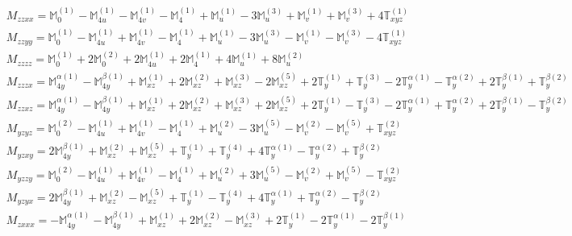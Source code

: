 \documentclass[fleqn,8pt,landscape]{jsarticle}
\begin{document}
\begin{align*}
& M_{zzxx} = \mathbb{M}_{0}^{(1)} - \mathbb{M}_{4u}^{(1)} - \mathbb{M}_{4v}^{(1)} - \mathbb{M}_{4}^{(1)} + \mathbb{M}_{u}^{(1)} - 3 \mathbb{M}_{u}^{(3)} + \mathbb{M}_{v}^{(1)} + \mathbb{M}_{v}^{(3)} + 4 \mathbb{T}_{xyz}^{(1)} \\
& M_{zzyy} = \mathbb{M}_{0}^{(1)} - \mathbb{M}_{4u}^{(1)} + \mathbb{M}_{4v}^{(1)} - \mathbb{M}_{4}^{(1)} + \mathbb{M}_{u}^{(1)} - 3 \mathbb{M}_{u}^{(3)} - \mathbb{M}_{v}^{(1)} - \mathbb{M}_{v}^{(3)} - 4 \mathbb{T}_{xyz}^{(1)} \\
& M_{zzzz} = \mathbb{M}_{0}^{(1)} + 2 \mathbb{M}_{0}^{(2)} + 2 \mathbb{M}_{4u}^{(1)} + 2 \mathbb{M}_{4}^{(1)} + 4 \mathbb{M}_{u}^{(1)} + 8 \mathbb{M}_{u}^{(2)} \\
& M_{zzzx} = \mathbb{M}_{4y}^{\alpha(1)} - \mathbb{M}_{4y}^{\beta(1)} + \mathbb{M}_{xz}^{(1)} + 2 \mathbb{M}_{xz}^{(2)} + \mathbb{M}_{xz}^{(3)} - 2 \mathbb{M}_{xz}^{(5)} + 2 \mathbb{T}_{y}^{(1)} + \mathbb{T}_{y}^{(3)} - 2 \mathbb{T}_{y}^{\alpha(1)} - \mathbb{T}_{y}^{\alpha(2)} + 2 \mathbb{T}_{y}^{\beta(1)} + \mathbb{T}_{y}^{\beta(2)} \\
& M_{zzxz} = \mathbb{M}_{4y}^{\alpha(1)} - \mathbb{M}_{4y}^{\beta(1)} + \mathbb{M}_{xz}^{(1)} + 2 \mathbb{M}_{xz}^{(2)} + \mathbb{M}_{xz}^{(3)} + 2 \mathbb{M}_{xz}^{(5)} + 2 \mathbb{T}_{y}^{(1)} - \mathbb{T}_{y}^{(3)} - 2 \mathbb{T}_{y}^{\alpha(1)} + \mathbb{T}_{y}^{\alpha(2)} + 2 \mathbb{T}_{y}^{\beta(1)} - \mathbb{T}_{y}^{\beta(2)} \\
& M_{yzyz} = \mathbb{M}_{0}^{(2)} - \mathbb{M}_{4u}^{(1)} + \mathbb{M}_{4v}^{(1)} - \mathbb{M}_{4}^{(1)} + \mathbb{M}_{u}^{(2)} - 3 \mathbb{M}_{u}^{(5)} - \mathbb{M}_{v}^{(2)} - \mathbb{M}_{v}^{(5)} + \mathbb{T}_{xyz}^{(2)} \\
& M_{yzxy} = 2 \mathbb{M}_{4y}^{\beta(1)} + \mathbb{M}_{xz}^{(2)} + \mathbb{M}_{xz}^{(5)} + \mathbb{T}_{y}^{(1)} + \mathbb{T}_{y}^{(4)} + 4 \mathbb{T}_{y}^{\alpha(1)} - \mathbb{T}_{y}^{\alpha(2)} + \mathbb{T}_{y}^{\beta(2)} \\
& M_{yzzy} = \mathbb{M}_{0}^{(2)} - \mathbb{M}_{4u}^{(1)} + \mathbb{M}_{4v}^{(1)} - \mathbb{M}_{4}^{(1)} + \mathbb{M}_{u}^{(2)} + 3 \mathbb{M}_{u}^{(5)} - \mathbb{M}_{v}^{(2)} + \mathbb{M}_{v}^{(5)} - \mathbb{T}_{xyz}^{(2)} \\
& M_{yzyx} = 2 \mathbb{M}_{4y}^{\beta(1)} + \mathbb{M}_{xz}^{(2)} - \mathbb{M}_{xz}^{(5)} + \mathbb{T}_{y}^{(1)} - \mathbb{T}_{y}^{(4)} + 4 \mathbb{T}_{y}^{\alpha(1)} + \mathbb{T}_{y}^{\alpha(2)} - \mathbb{T}_{y}^{\beta(2)} \\
& M_{zxxx} = - \mathbb{M}_{4y}^{\alpha(1)} - \mathbb{M}_{4y}^{\beta(1)} + \mathbb{M}_{xz}^{(1)} + 2 \mathbb{M}_{xz}^{(2)} - \mathbb{M}_{xz}^{(3)} + 2 \mathbb{T}_{y}^{(1)} - 2 \mathbb{T}_{y}^{\alpha(1)} - 2 \mathbb{T}_{y}^{\beta(1)} \\

\end{align*}
\end{document}
